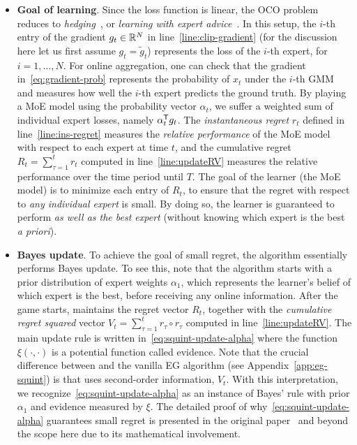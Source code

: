 \begin{itemize}
\item  {\bf Goal of learning}. Since the loss function is linear, the OCO problem reduces to \emph{hedging}~\cite{freund1997decision}, or \emph{learning with expert advice}~\cite{orabona19book-modern}. In this setup, the $i$-th entry of the gradient ${g_t} \in { {\mathbb R}^{N} }$ in line~\ref{line:clip-gradient} (for the discussion here let us first assume $g_t = \tilde{g}_t$) represents the loss of the $i$-th expert, for $i=1,\dots,N$. For online aggregation, one can check that the gradient in~\eqref{eq:gradient-prob} represents the probability of $x_t$ under the $i$-th GMM and measures how well the $i$-th expert predicts the ground truth. By playing a MoE model using the probability vector $\alpha_t$, we suffer a weighted sum of individual expert losses, namely $\alpha_t^{\mathsf{T}} g_t$. The \emph{instantaneous regret} $r_t$ defined in line~\ref{line:ins-regret} measures the \emph{relative performance} of the MoE model with respect to each expert at time $t$, and the cumulative regret $R_t = \sum_{\tau=1}^t r_t$ computed in line~\ref{line:updateRV} measures the relative performance over the time period until $T$. The goal of the learner (\ie the MoE model) is to minimize each entry of $R_t$, \ie to ensure that the regret with respect to \emph{any individual expert} is small. By doing so, the learner is guaranteed to perform \emph{as well as the best expert} (without knowing which expert is the best \emph{a priori}).

\item {\bf Bayes update}. To achieve the goal of small regret, the \squint algorithm essentially performs Bayes update. To see this, note that the algorithm starts with a prior distribution of expert weights $\alpha_1$, which represents the learner's belief of which expert is the best, before receiving any online information. After the game starts, \squint maintains the regret vector $R_t$, together with the \emph{cumulative regret squared} vector $V_t = \sum_{\tau=1}^t r_\tau \circ r_\tau$ computed in line~\ref{line:updateRV}. The main update rule is written in~\eqref{eq:squint-update-alpha} where the function $\xi(\cdot,\cdot)$ is a potential function called \squint evidence. Note that the crucial difference between \squint and the vanilla EG algorithm (see Appendix~\ref{app:eg-squint}) is that \squint uses second-order information, \ie $V_t$. With this interpretation, we recognize~\eqref{eq:squint-update-alpha} as an instance of Bayes' rule with prior $\alpha_1$ and evidence measured by $\xi$. The detailed proof of why~\eqref{eq:squint-update-alpha} guarantees small regret is presented in the original paper~\cite{koolen2015secondorder} and beyond the scope here due to its mathematical involvement. 


\end{itemize}
